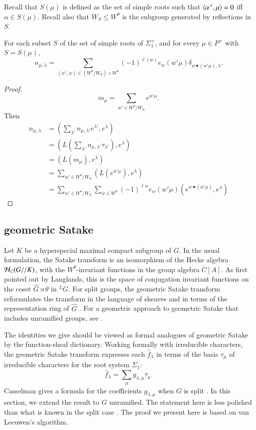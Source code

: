 Recall that $S(\mu)$ is defined as the set of simple roots such that
$\langle{\alpha^\vee,\mu}\rangle=0$ iff $\alpha\in S(\mu)$.  Recall also that
$W_S\le W^\theta$ is the subgroup generated by reflections in $S$.

\begin{lemma}  \label{lemma:van}
  For each subset $S$ of the set of simple roots of $\Sigma^+_1$, and
  for every $\mu\in P^+$ with $S = S(\mu)$,
\[
n_{\mu,\lambda}=\sum_{(w',w)\in (W^\theta/W_S)\times W^\theta}
 (-1)^{\ell(w)} e_w(w'\mu) \delta_{w\bullet (w'\mu),\lambda}. 
\]
\end{lemma}

\begin{proof}  
\[
m_\mu = \sum_{w'\in W^\theta/W_S} e^{w' \mu}.
\]
Then
\begin{align*}
n_{\mu,\lambda} 
    &= (\sum_{\lambda'} n_{\mu,{\lambda'}} e^{\lambda'},e^\lambda) \\
     &= (L(\sum_{\lambda'} n_{\mu,\lambda'} \tau_{\lambda'}),e^\lambda) \\
     &= (L(m_\mu),e^\lambda) \\
     &= \sum_{w'\in W^\theta/W_S} (L(e^{w'\mu}),e^\lambda)\\
     &= \sum_{w'\in W^\theta/W_S} \sum_{w\in W^\theta} 
      (-1)^{\ell w} e_w(w'\mu) (e^{w\bullet (w'\mu)},e^\lambda)
\end{align*}
\end{proof}


\subsection{geometric Satake}

Let $K$ be a hyperspecial maximal compact subgroup of $G$.  In the
usual formulation, the Satake transform is an isomorphism of the Hecke
algebra $\mathcal H_{\mathbb{C}}(G//K)$, with the $W^\theta$-invariant functions
in the group algebra $\ring{C}[A]$.  As first pointed out by
Langlands, this is the space of conjugation invariant functions on the
coset $\hat G\rtimes \theta$ in ${}^LG$.  For split groups, the
geometric Satake transform reformulates the transform in the language
of sheaves and in terms of the representation ring of $\hat G$
\cite{mirkovic2007geometric}.  For a geometric approach to geometric
Satake that includes unramified groups, see \cite{zhu2011geometric}.

The identities we give should be viewed as formal analogues of
geometric Satake by the function-sheaf
dictionary. %
Working formally with irreducible characters, the geometric Satake
transform expresses each $\hat f_\lambda$ in terms of the basis
$\tau_\mu$ of irreducible characters for the root system $\Sigma_1$:
\begin{equation}\label{eqn:geometric-satake}
\hat f_\lambda = \sum_\mu g_{\lambda,\mu} \tau_\mu.
\end{equation}
Casselman gives a formula for the coefficients $g_{\lambda,\mu}$ when
$G$ is split \cite{casymmetric}.  In this section, we extend the
result to $G$ unramified.  The statement here is less polished than
what is known in the split case \cite{casymmetric}.  The proof we
present here is based on van Leeuwen's algorithm.

